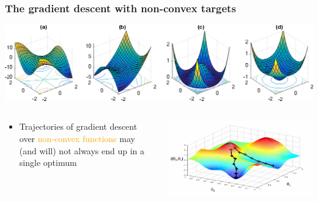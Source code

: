 \documentclass[usenames,dvipsnames,aspectratio=169]{beamer}
\begin{document}
\begin{frame}
\frametitle{The gradient descent with non-convex targets}

\begin{center}
  \includegraphics[width=1.\columnwidth]{nonconvex_functions.png}
\end{center}

\pause

\vspace{-2em}

\begin{columns}
\begin{column}{0.5\textwidth}

    \begin{itemize}

    \item Trajectories of gradient descent over \textcolor{orange}{non-convex functions}
    may (and will) not always end up in a single optimum

    \end{itemize}

\end{column}
\begin{column}{0.5\textwidth}  %

\begin{center}
  \includegraphics[width=1.\columnwidth]{nonconvex_sgd.png}  
\end{center}

\end{column}
\end{columns}

\end{frame}
\end{document}
